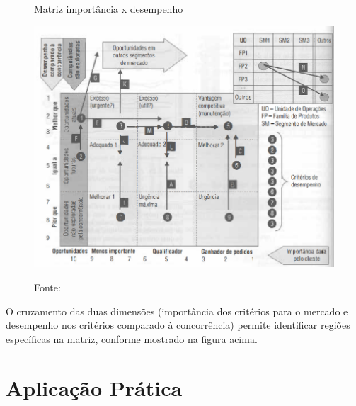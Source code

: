 \begin{figure}[H]
  \caption{Matriz importância x desempenho}
  \includegraphics[width =1\textwidth]{images/impor_desem.png}
  \label{fig:matriz_importancia_desempenho}
  \caption*{Fonte: \cite{correa2000administracao}}
\end{figure}

O cruzamento das duas dimensões (importância dos critérios para o mercado e desempenho nos critérios comparado à concorrência) permite identificar regiões específicas na matriz, conforme mostrado na figura acima.




\section{Aplicação Prática} 
\label{sec:estrategia_da_producao_aplicacao}